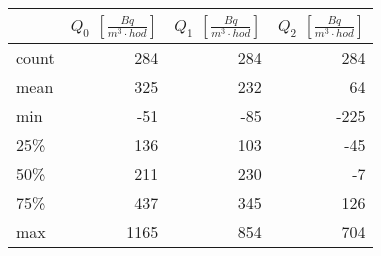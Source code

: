 \begin{tabular}{lrrr}
\toprule
{} &  $Q_0$ $\left[\si{\frac{Bq}{m^3\cdot hod}}\right]$ &  $Q_1$ $\left[\si{\frac{Bq}{m^3\cdot hod}}\right]$ &  $Q_2$ $\left[\si{\frac{Bq}{m^3\cdot hod}}\right]$ \\
\midrule
count &                                                284 &                                                284 &                                                284 \\
mean  &                                                325 &                                                232 &                                                 64 \\
min   &                                                -51 &                                                -85 &                                               -225 \\
25\%   &                                                136 &                                                103 &                                                -45 \\
50\%   &                                                211 &                                                230 &                                                 -7 \\
75\%   &                                                437 &                                                345 &                                                126 \\
max   &                                               1165 &                                                854 &                                                704 \\
\bottomrule
\end{tabular}
